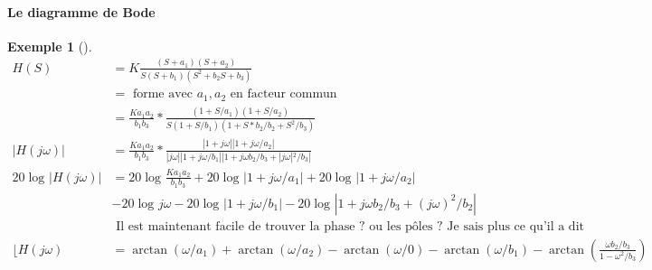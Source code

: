 \documentclass{article}
\theoremstyle{plain}%
\theoremstyle{definition}
\newtheorem{exmp}{Exemple}[section]
\theoremstyle{remark}
\begin{document}
\paragraph*{Le diagramme de Bode}
\begin{exmp}[]
    \begin{align*}
        H(S) &= K \frac{(S + a_1)(S+a_2)}{S(S+b_1)(S^2 + b_2 S + b_3)} \\
            &= \text{ forme avec } a_1, a_2 \text{ en facteur commun} \\
            &= \frac{K a_1 a_2}{b_1 b_3} * \frac{(1 + S/a_1)(1+S/a_2)}{S(1+S/b_1)(1 + S*b_2/b_2 + S^2/b_3)} \\ 
        \left| H(j \omega ) \right| &= \frac{K a_1 a_2}{b_1 b_3} * \frac{|1+j \omega | |1 + j \omega /a_2|}{|j \omega | |1 + j \omega /b_1||1 + j \omega b_2/b_3  + |j \omega |^2 / b_3|} \\ 
        20 \log_{} \left| H(j \omega ) \right| &= 20 \log_{} \frac{K a_1 a_2}{b_1 b_3} + 20 \log_{} | 1 + j \omega / a_1 | + 20 \log_{} | 1 + j \omega / a_2 | \\
            & - 20 \log_{} j \omega - 20 \log_{} |1 + j \omega / b_1| - 20 \log_{} | 1 + j \omega b_2 / b_3  + (j \omega)^2 / b_2 | \\
            & \text{ Il est maintenant facile de trouver la phase ? ou les pôles ? Je sais plus ce qu'il a dit } \\
        \lfloor H(j \omega) &= \arctan (\omega / a_1) + \arctan (\omega /a_2) - \arctan (\omega / 0) - \arctan (\omega / b_1) - \arctan (\frac{\omega b_2/b_3}{1 - \omega ^2 / b_3})
    \end{align*}
\end{exmp}
\end{document}

